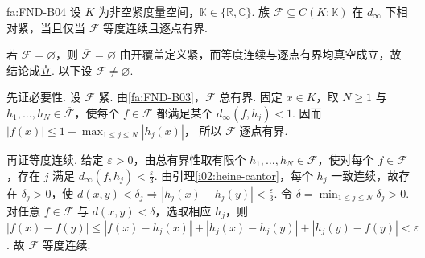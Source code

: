 \begin{FATheorem}{fa:FND-B04}
设 \(\displaystyle K\) 为非空紧度量空间，\(\displaystyle \mathbb K\in\{\mathbb R,\mathbb C\}\). 族 \(\displaystyle \mathcal F\subseteq C(K;\mathbb K)\) 在 \(\displaystyle d_\infty\) 下相对紧，当且仅当 \(\displaystyle \mathcal F\) 等度连续且逐点有界.
\end{FATheorem}

\begin{FAProof}
若 \(\displaystyle \mathcal F=\varnothing\)，则 \(\displaystyle \overline{\mathcal F}=\varnothing\) 由开覆盖定义紧，而等度连续与逐点有界均真空成立，故结论成立. 以下设 \(\displaystyle \mathcal F\neq\varnothing\).

先证必要性. 设 \(\displaystyle \overline{\mathcal F}\) 紧. 由\autoref{fa:FND-B03}，\(\displaystyle \overline{\mathcal F}\) 总有界. 固定 \(\displaystyle x\in K\)，取 \(\displaystyle N\geqslant1\) 与 \(\displaystyle h_1,\dots,h_N\in\overline{\mathcal F}\)，使每个 \(\displaystyle f\in\mathcal F\) 都满足某个 \(\displaystyle d_\infty(f,h_j)<1\). 因而
\(\displaystyle |f(x)|\leqslant 1+\max_{1\leqslant j\leqslant N}|h_j(x)|\)，
所以 \(\displaystyle \mathcal F\) 逐点有界.

再证等度连续. 给定 \(\displaystyle \varepsilon>0\)，由总有界性取有限个 \(\displaystyle h_1,\dots,h_N\in\overline{\mathcal F}\)，使对每个 \(\displaystyle f\in\mathcal F\)，存在 \(\displaystyle j\) 满足 \(\displaystyle d_\infty(f,h_j)<\frac{\varepsilon}{3}\). 由引理\ref{i02:heine-cantor}，每个 \(\displaystyle h_j\) 一致连续，故存在 \(\displaystyle \delta_j>0\)，使 \(\displaystyle d(x,y)<\delta_j\Rightarrow |h_j(x)-h_j(y)|<\frac{\varepsilon}{3}\). 令 \(\displaystyle \delta=\min_{1\leqslant j\leqslant N}\delta_j>0\). 对任意 \(\displaystyle f\in\mathcal F\) 与 \(\displaystyle d(x,y)<\delta\)，选取相应 \(\displaystyle h_j\)，则 \(\displaystyle |f(x)-f(y)| \leqslant |f(x)-h_j(x)|+|h_j(x)-h_j(y)|+|h_j(y)-f(y)|<\varepsilon\).
故 \(\displaystyle \mathcal F\) 等度连续.


\end{FAProof}
